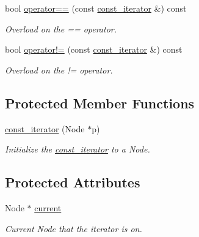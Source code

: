\begin{DoxyCompactItemize}
bool \mbox{\hyperlink{classsc_1_1list_1_1const__iterator_a20f61345413f1ffe547c881e6bdc242f}{operator==}} (const \mbox{\hyperlink{classsc_1_1list_1_1const__iterator}{const\+\_\+iterator}} \&) const
\begin{DoxyCompactList}\small\item\em Overload on the == operator. \end{DoxyCompactList}\item 
\mbox{\label{classsc_1_1list_1_1const__iterator_af23fb97b38945f60d4acdc9436f94efa}} 
bool \mbox{\hyperlink{classsc_1_1list_1_1const__iterator_af23fb97b38945f60d4acdc9436f94efa}{operator!=}} (const \mbox{\hyperlink{classsc_1_1list_1_1const__iterator}{const\+\_\+iterator}} \&) const
\begin{DoxyCompactList}\small\item\em Overload on the != operator. \end{DoxyCompactList}\end{DoxyCompactItemize}
\subsection*{Protected Member Functions}
\begin{DoxyCompactItemize}
\item 
\mbox{\label{classsc_1_1list_1_1const__iterator_abb42cbfb1699cb7427d9ab8a4d683b92}} 
\mbox{\hyperlink{classsc_1_1list_1_1const__iterator_abb42cbfb1699cb7427d9ab8a4d683b92}{const\+\_\+iterator}} (Node $\ast$p)
\begin{DoxyCompactList}\small\item\em Initialize the \mbox{\hyperlink{classsc_1_1list_1_1const__iterator}{const\+\_\+iterator}} to a Node. \end{DoxyCompactList}\end{DoxyCompactItemize}
\subsection*{Protected Attributes}
\begin{DoxyCompactItemize}
\item 
\mbox{\label{classsc_1_1list_1_1const__iterator_ac8a1ecff3dcc804cd3fabfaf2360d461}} 
Node $\ast$ \mbox{\hyperlink{classsc_1_1list_1_1const__iterator_ac8a1ecff3dcc804cd3fabfaf2360d461}{current}}
\begin{DoxyCompactList}\small\item\em Current Node that the iterator is on. \end{DoxyCompactList}\end{DoxyCompactItemize}
